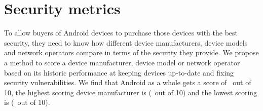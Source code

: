\section{Security metrics}\label{sec:androidvulnerability}
\label{sec:security_scoring}\label{sec:exp:security_score}

To allow buyers of Android devices to purchase those devices with the best security, they need to know how different device manufacturers, device models and network operators compare in terms of the security they provide.
We propose a method to score a device manufacturer, device model or network operator based on its historic performance at keeping devices up-to-date and fixing security vulnerabilities.
We find that Android as a whole gets a score of \daSecurityScore\ out of 10, the highest scoring device manufacturer is \emph{\daSecScoreBestmanufacturer} (\daSecScoreBestmanufacturerScore\ out of 10) and the lowest scoring is \emph{\daSecScoreWorstmanufacturer} (\daSecScoreWorstmanufacturerScore\ out of 10).

